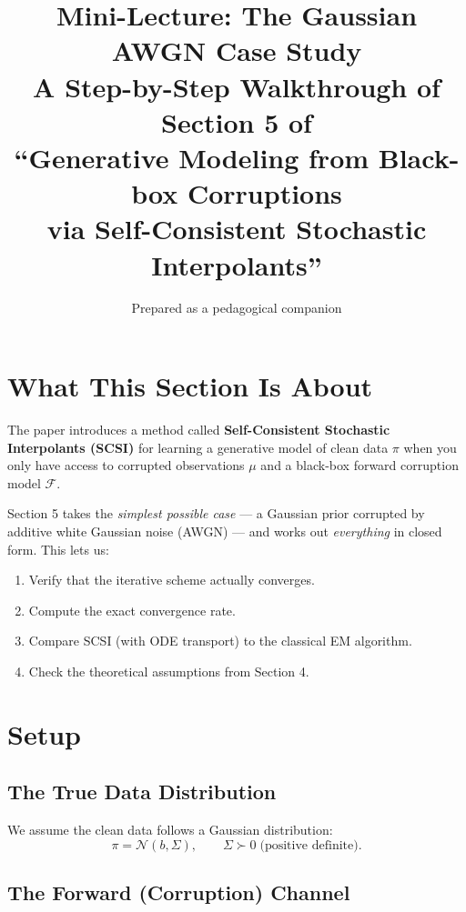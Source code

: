 \documentclass[11pt, a4paper]{article}
\title{\textbf{Mini-Lecture: The Gaussian AWGN Case Study} \\[6pt]
\large A Step-by-Step Walkthrough of Section 5 of \\
``Generative Modeling from Black-box Corruptions \\via Self-Consistent Stochastic Interpolants''}
\author{Prepared as a pedagogical companion}
\date{}
\theoremstyle{definition}
\begin{document}
\maketitle

\tableofcontents
\newpage

\section{What This Section Is About}

The paper introduces a method called \textbf{Self-Consistent Stochastic Interpolants (SCSI)} for learning a generative model of clean data $\pi$ when you only have access to corrupted observations $\mu$ and a black-box forward corruption model $\mathcal{F}$.

Section 5 takes the \emph{simplest possible case} --- a Gaussian prior corrupted by additive white Gaussian noise (AWGN) --- and works out \emph{everything} in closed form. This lets us:
\begin{enumerate}[label=(\roman*)]
    \item Verify that the iterative scheme actually converges.
    \item Compute the exact convergence rate.
    \item Compare SCSI (with ODE transport) to the classical EM algorithm.
    \item Check the theoretical assumptions from Section 4.
\end{enumerate}

\section{Setup}

\subsection{The True Data Distribution}

We assume the clean data follows a Gaussian distribution:
\[
    \pi = \mathcal{N}(b, \Sigma), \qquad \Sigma \succ 0 \;\text{(positive definite)}.
\]

\subsection{The Forward (Corruption) Channel}
\end{document}
